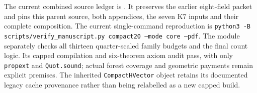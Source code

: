 The current combined source ledger is
.
It preserves the earlier eight-field packet and pins this parent source,
both appendices, the seven K7 inputs and their complete composition.
The current single-command reproduction is
\texttt{python3 -B scripts/verify\_manuscript.py compact20 --mode core --pdf}.
The module  separately
checks all thirteen quarter-scaled family budgets and the final count
logic. Its capped compilation and six-theorem axiom audit pass, with
only \texttt{propext} and \texttt{Quot.sound}; actual forest coverage and
geometric payments remain explicit premises. The inherited
\texttt{CompactHVector} object retains its documented legacy cache
provenance rather than being relabelled as a new capped build.
